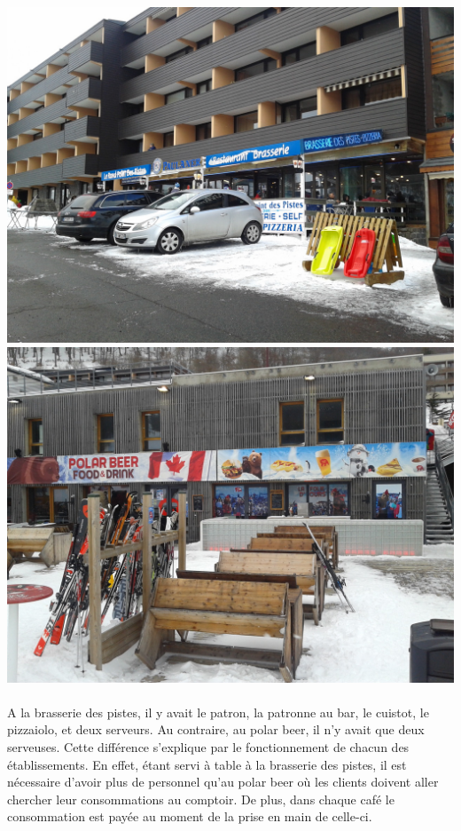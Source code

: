 \begin{center}
\includegraphics[scale=0.15]{brasserieDesPistes.jpg}
\includegraphics[scale=0.15]{PolarBeer.jpg}
\end{center}

\paragraph{}
 A la brasserie des pistes, il y avait le patron, la patronne au bar, le cuistot, le pizzaiolo, et deux serveurs. Au contraire, au polar beer, il n’y avait que deux serveuses. Cette différence s’explique par le fonctionnement de chacun des établissements. En effet, étant servi à table à la brasserie des pistes, il est nécessaire d’avoir plus de personnel qu’au polar beer où les clients doivent aller chercher leur consommations au comptoir. De plus, dans chaque café le consommation est payée au moment de la prise en main de celle-ci. 

